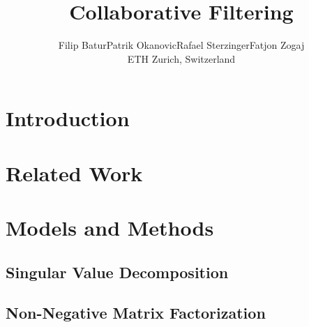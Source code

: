 \documentclass[10pt,conference,compsocconf]{IEEEtran}
\newcommand{\spacing}{\hspace{1cm}}
\begin{document}
    \title{Collaborative Filtering}

    \author{
    Filip Batur\spacing Patrik Okanovic\spacing Rafael Sterzinger\spacing Fatjon Zogaj\\
    ETH Zurich, Switzerland
    }

    \maketitle

    \begin{abstract}

    \end{abstract}


    \section{Introduction}


    \section{Related Work}


    \section{Models and Methods}



    \subsection{Singular Value Decomposition}

    \subsection{Non-Negative Matrix Factorization}
\end{document}
